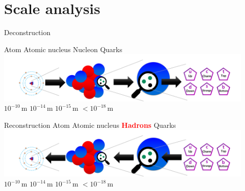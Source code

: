 \section{Scale analysis}
\begin{frame}{Deconstruction}

    \hspace{1.1cm} Atom \hspace{0.7cm} Atomic nucleus \hspace{0.8cm} Nucleon  \hfill Quarks~~\\\vspace{1cm}
     \includegraphics[width=12.5cm]{Figures Lecture on Hadrons/Scale Atom_Quark_updown-approach.png}\\\vspace{1cm}
   \hspace{1.1cm} $10^{-10}$\,m \hspace{1.2cm}  $10^{-14}$\,m  \hspace{1.5cm}  $10^{-15}$\,m  \hspace{1.3cm}  $<10^{-18}$\,m

\end{frame}
\begin{frame}{Reconstruction}
     \hspace{1.1cm} Atom \hspace{0.7cm} Atomic nucleus \hspace{0.8cm} \textbf{\textcolor{red}{Hadrons}} \hfill Quarks~~\\\vspace{1cm}
     \includegraphics[width=12.5cm]{Figures Lecture on Hadrons/Scale Atom_Quark_downup-approach.png}\\\vspace{1cm}
   \hspace{1.1cm} $10^{-10}$\,m \hspace{1.2cm}  $10^{-14}$\,m  \hspace{1.5cm}  $10^{-15}$\,m  \hspace{1.3cm}  $<10^{-18}$\,m
\end{frame}
